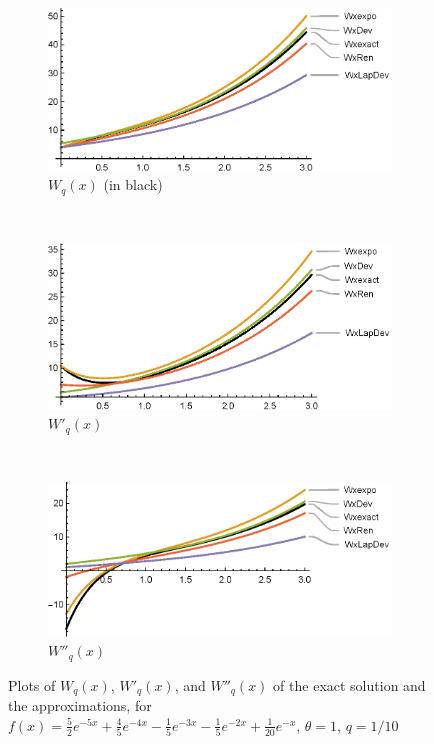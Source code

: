 \begin{figure}[!h]
    \centering
    \begin{subfigure}[b]{0.8\textwidth}
        \includegraphics[width=\textwidth]{NH5mmW}
        \caption{$W_q(x)$ (in black)}
        \label{fig:NH5mmW}
    \end{subfigure}
    ~
    \\
    \begin{subfigure}[b]{0.8\textwidth}
        \includegraphics[width=\textwidth]{NH5mmW1}
        \caption{$W'_q(x) $}
        \label{fig:NH5mmW1}
    \end{subfigure}
    ~
    \\
    \begin{subfigure}[b]{0.8\textwidth}
        \includegraphics[width=\textwidth]{NH5mmW2}
        \caption{$W''_q(x)$}
        \label{fig:NH5mmW2}
    \end{subfigure}
    \caption{Plots of $W_q(x)$, $W'_q(x)$, and $W''_q(x)$ of the exact solution and the approximations, for $f(x)=\frac{5}{2 }e^{-5x}+\frac{4}{5} e^{-4 x}-\frac{1}{5}e^{-3x}- \frac{1}{5}e^{-2x}+ \frac{1}{20}e^{-x}$, $\theta=1$, $q=1/10$}
    \label{fig:NH5mm}
\end{figure}


